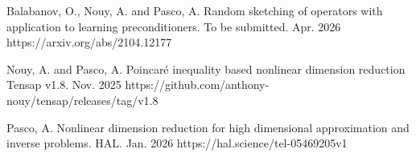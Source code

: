 \begin{cvpublications}


\cvpublication
{Balabanov, O., Nouy, A. and Pasco, A.} %
{Random sketching of operators with application to learning preconditioners.} %
{To be submitted.} %
{Apr. 2026} %
{https://arxiv.org/abs/2104.12177} %



\end{cvpublications}



\begin{cvpublications}


\cvpublication
{Nouy, A. and Pasco, A.} %
{Poincar\'e inequality based nonlinear dimension reduction} %
{Tensap v1.8.} %
{Nov. 2025} %
{https://github.com/anthony-nouy/tensap/releases/tag/v1.8} %


\end{cvpublications}




\begin{cvpublications}


\cvpublication
{Pasco, A.} %
{Nonlinear dimension reduction for high dimensional approximation and inverse problems.} %
{HAL.} %
{Jan. 2026} %
{https://hal.science/tel-05469205v1} %


\end{cvpublications}

